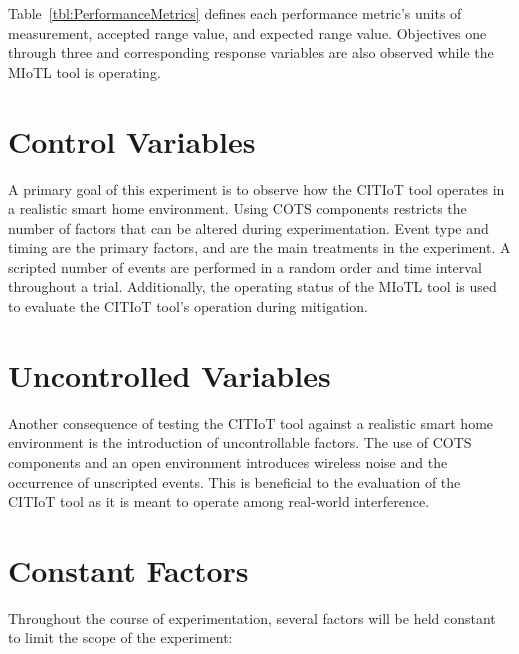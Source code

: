\documentclass[12pt,letterpaper,oneside]{book}
\begin{document}
		Table~\ref{tbl:PerformanceMetrics} defines each performance metric's units of measurement, accepted range value, and expected range value. Objectives one through three and corresponding response variables are also observed while the \ac{MIoTL} tool is operating.
		
		\tablePerformanceMetrics
		
		\section{Control Variables} \label{controlVariables}
		
		A primary goal of this experiment is to observe how the \ac{CITIoT} tool operates in a realistic smart home environment. Using \ac{COTS} components restricts the number of factors that can be altered during experimentation. Event type and timing are the primary factors, and are the main treatments in the experiment. A scripted number of events are performed in a random order and time interval throughout a trial. Additionally, the operating status of the \ac{MIoTL} tool is used to evaluate the \ac{CITIoT} tool's operation during mitigation.
		
		\section{Uncontrolled Variables} \label{uncontrolledVariables}
		
		Another consequence of testing the \ac{CITIoT} tool against a realistic smart home environment is the introduction of uncontrollable factors. The use of \ac{COTS} components and an open environment introduces wireless noise and the occurrence of unscripted events. This is beneficial to the evaluation of the \ac{CITIoT} tool as it is meant to operate among real-world interference. 
		
		\section{Constant Factors} \label{constantFactors}
		
		Throughout the course of experimentation, several factors will be held constant to limit the scope of the experiment:
		
\end{document}
